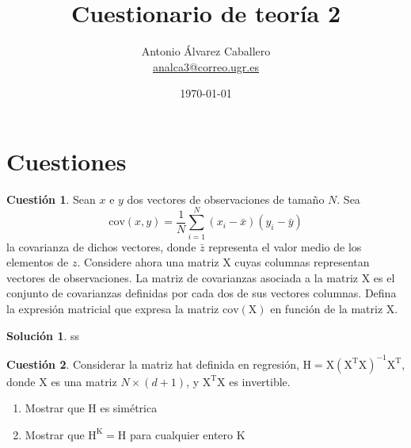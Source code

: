 \documentclass[a4paper, 11pt]{article}
\title{Cuestionario de teoría 2}
\author{Antonio Álvarez Caballero\\
    \href{mailto:analca3@correo.ugr.es}{analca3@correo.ugr.es}}
\date{\today}
\theoremstyle{definition}
\newtheorem{cuestion}{Cuestión}
\newtheorem*{solucion}{Solución}
\begin{document}
  \maketitle

  \section{Cuestiones}

  \begin{cuestion}
    Sean $x$ e $y$ dos vectores de observaciones de tamaño $N$. Sea
    \[
    \mathrm{cov}(x,y)=\frac{1}{N}\sum_{i=1}^N (x_i-\bar{x})(y_i-\bar{y})
    \]
    la covarianza de dichos vectores, donde $\bar{z}$ representa el valor medio de los elementos de $z$. Considere ahora una matriz $\mathrm{X}$ cuyas columnas representan vectores de observaciones. La matriz de covarianzas asociada a la matriz $\mathrm{X}$ es el conjunto de covarianzas definidas por cada dos de sus vectores columnas. Defina la expresión matricial que expresa la matriz $\mathrm{cov}(\mathrm{X})$ en función de la matriz $\mathrm{X}$.
  \end{cuestion}

  \begin{solucion}
    ss
  \end{solucion}

  \begin{cuestion}
    Considerar la matriz hat definida en regresión,  $\mathrm{H}=\mathrm{X(X^TX)^{-1}X^T}$, donde $\mathrm{X}$ es una matriz  $N\times (d+1)$, y $\mathrm{X^TX}$ es invertible.
    \begin{enumerate}
        \item Mostrar que H es simétrica
        \item Mostrar que $\mathrm{H^K=H}$ para cualquier entero K
    \end{enumerate}
  \end{cuestion}
\end{document}
